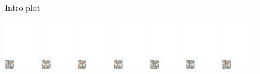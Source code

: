 \documentclass[a4paper,UKenglish,cleveref, autoref, thm-restate]{lipics-v2021}
\begin{document}
\begin{figure}
  \centering
  \small
  
  \caption{Intro plot}
\end{figure}

\begin{figure}
  \centering
  \hspace{0.055\textwidth}%
  \includegraphics[page=1,width=0.132\textwidth]{../data/visualization}%
  \hspace{0.002\textwidth}%
  \includegraphics[page=2,width=0.132\textwidth]{../data/visualization}%
  \hspace{0.002\textwidth}%
  \includegraphics[page=3,width=0.132\textwidth]{../data/visualization}%
  \hspace{0.002\textwidth}%
  \includegraphics[page=4,width=0.132\textwidth]{../data/visualization}%
  \hspace{0.002\textwidth}%
  \includegraphics[page=5,width=0.132\textwidth]{../data/visualization}%
  \hspace{0.002\textwidth}%
  \includegraphics[page=6,width=0.132\textwidth]{../data/visualization}%
  \hspace{0.002\textwidth}%
  \includegraphics[page=7,width=0.132\textwidth]{../data/visualization}%
  

\end{figure}
\end{document}
